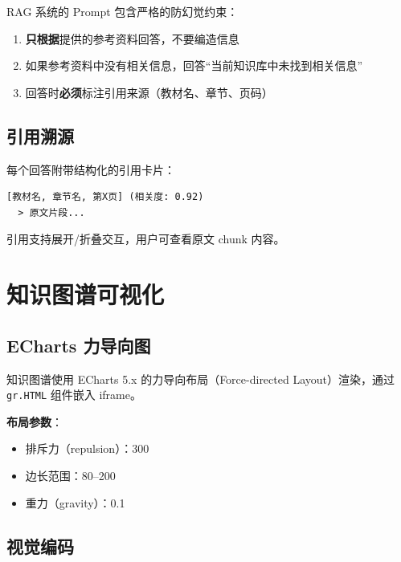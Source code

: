 \documentclass[12pt,a4paper]{article}
\begin{document}
RAG 系统的 Prompt 包含严格的防幻觉约束：

\begin{warnbox}
\begin{enumerate}[leftmargin=1em]
    \item \textbf{只根据}提供的参考资料回答，不要编造信息
    \item 如果参考资料中没有相关信息，回答``当前知识库中未找到相关信息''
    \item 回答时\textbf{必须}标注引用来源（教材名、章节、页码）
\end{enumerate}
\end{warnbox}

\subsection{引用溯源}

每个回答附带结构化的引用卡片：

\begin{lstlisting}[language={}, title={引用卡片格式}]
[教材名, 章节名, 第X页] (相关度: 0.92)
  > 原文片段...
\end{lstlisting}

引用支持展开/折叠交互，用户可查看原文 chunk 内容。

\section{知识图谱可视化}
\label{sec:visualization}

\subsection{ECharts 力导向图}

知识图谱使用 ECharts 5.x 的力导向布局（Force-directed Layout）渲染，通过 \texttt{gr.HTML} 组件嵌入 iframe。

\textbf{布局参数}：
\begin{itemize}[leftmargin=2em]
    \item 排斥力（repulsion）：300
    \item 边长范围：80--200
    \item 重力（gravity）：0.1
\end{itemize}

\subsection{视觉编码}
\end{document}
